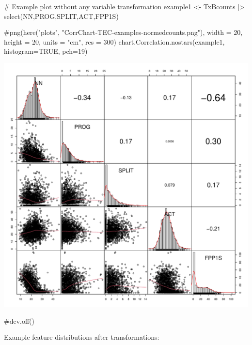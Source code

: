 \documentclass[
  letterpaper,
  DIV=11,
  numbers=noendperiod]{scrreprt}
\newenvironment{Shaded}{\begin{snugshade}}{\end{snugshade}}
\newcommand{\AttributeTok}[1]{\textcolor[rgb]{0.40,0.45,0.13}{#1}}
\newcommand{\CommentTok}[1]{\textcolor[rgb]{0.37,0.37,0.37}{#1}}
\newcommand{\ConstantTok}[1]{\textcolor[rgb]{0.56,0.35,0.01}{#1}}
\newcommand{\DecValTok}[1]{\textcolor[rgb]{0.68,0.00,0.00}{#1}}
\newcommand{\FunctionTok}[1]{\textcolor[rgb]{0.28,0.35,0.67}{#1}}
\newcommand{\NormalTok}[1]{\textcolor[rgb]{0.00,0.23,0.31}{#1}}
\newcommand{\OtherTok}[1]{\textcolor[rgb]{0.00,0.23,0.31}{#1}}
\newcommand{\SpecialCharTok}[1]{\textcolor[rgb]{0.37,0.37,0.37}{#1}}
\begin{document}
\begin{Shaded}
\begin{Highlighting}[]
\CommentTok{\# Example plot without any variable transformation}
\NormalTok{example1 }\OtherTok{\textless{}{-}}\NormalTok{ TxBcounts }\SpecialCharTok{|\textgreater{}} 
  \FunctionTok{select}\NormalTok{(NN,PROG,SPLIT,ACT,FPP1S)}

\CommentTok{\#png(here("plots", "CorrChart{-}TEC{-}examples{-}normedcounts.png"), width = 20, height = 20, units = "cm", res = 300)}
\FunctionTok{chart.Correlation.nostars}\NormalTok{(example1, }\AttributeTok{histogram=}\ConstantTok{TRUE}\NormalTok{, }\AttributeTok{pch=}\DecValTok{19}\NormalTok{)}
\end{Highlighting}
\end{Shaded}

\includegraphics{D_Ch6_DataPrep_files/figure-pdf/example-correlation-plots-1.pdf}

\begin{Shaded}
\begin{Highlighting}[]
\CommentTok{\#dev.off()}
\end{Highlighting}
\end{Shaded}

Example feature distributions after transformations:
\end{document}
